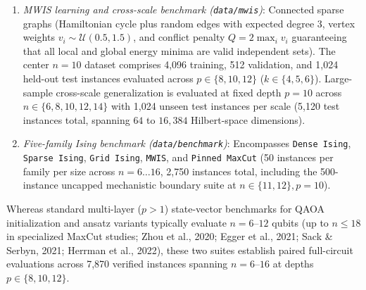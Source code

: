 \documentclass[10pt,a4paper]{article}
\begin{document}
\begin{enumerate}\setlength{\itemsep}{1pt}\setlength{\parskip}{1pt}\setlength{\topsep}{2pt}
\item \emph{MWIS learning and cross-scale benchmark (\texttt{data/\allowbreak{}mwis})}: Connected sparse graphs (Hamiltonian cycle plus random edges with expected degree $3$, vertex weights $v_i \sim \mathcal{U}(0.5, 1.5)$, and conflict penalty $Q = 2\max_i v_i$ guaranteeing that all local and global energy minima are valid independent sets). The center $n = 10$ dataset comprises 4,096 training, 512 validation, and 1,024 held-out test instances evaluated across $p \in \{8, 10, 12\}$ ($k \in \{4, 5, 6\}$). Large-sample cross-scale generalization is evaluated at fixed depth $p = 10$ across $n \in \{6, 8, 10, 12, 14\}$ with 1,024 unseen test instances per scale (5,120 test instances total, spanning $64$ to $16{,}384$ Hilbert-space dimensions).
\item \emph{Five-family Ising benchmark (\texttt{data/\allowbreak{}benchmark})}: Encompasses \texttt{Dense Ising}, \texttt{Sparse Ising}, \texttt{Grid Ising}, \texttt{MWIS}, and \texttt{Pinned MaxCut} (50 instances per family per size across $n = 6\ldots 16$, 2,750 instances total, including the 500-instance uncapped mechanistic boundary suite at $n \in \{11, 12\}, p = 10$).

\end{enumerate}
Whereas standard multi-layer ($p > 1$) state-vector benchmarks for QAOA initialization and ansatz variants typically evaluate $n = 6\mbox{--}12$ qubits (up to $n \le 18$ in specialized MaxCut studies; Zhou et al., 2020; Egger et al., 2021; Sack \& Serbyn, 2021; Herrman et al., 2022), these two suites establish paired full-circuit evaluations across 7,870 verified instances spanning $n = 6\mbox{--}16$ at depths $p \in \{8, 10, 12\}$.
\end{document}
